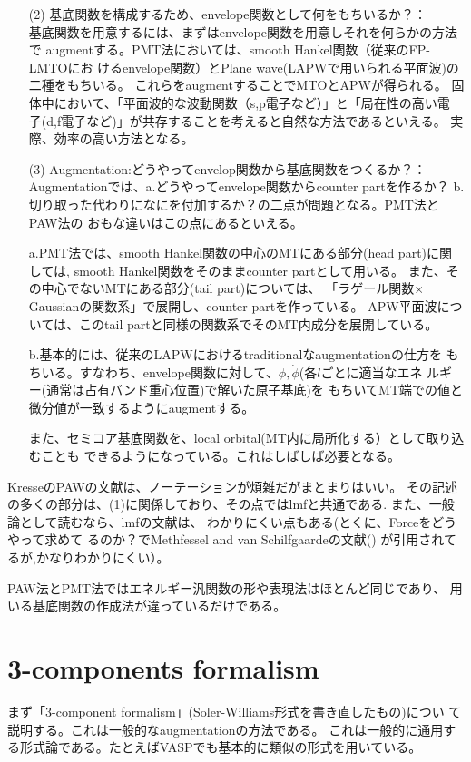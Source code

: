 \documentclass[twocolumn,showpacs,preprintnumbers,amsmath,amssymb,floatfix]{revtex4-1}
\def\phidot{\dot{\phi}}
\begin{document}
\begin{itemize}
\item[(2)]
基底関数を構成するため、envelope関数として何をもちいるか？：\\
基底関数を用意するには、まずはenvelope関数を用意しそれを何らかの方法で
augmentする。PMT法においては、smooth Hankel関数（従来のFP-LMTOにお
けるenvelope関数）とPlane wave(LAPWで用いられる平面波)の二種をもちいる。
これらをaugmentすることでMTOとAPWが得られる。
固体中において、「平面波的な波動関数（s,p電子など）」と「局在性の高い電
子(d,f電子など)」が共存することを考えると自然な方法であるといえる。
実際、効率の高い方法となる。

\item[(3)]
Augmentation:どうやってenvelop関数から基底関数をつくるか？：\\
Augmentationでは、a.どうやってenvelope関数からcounter partを作るか？
b.切り取った代わりになにを付加するか？の二点が問題となる。PMT法とPAW法の
おもな違いはこの点にあるといえる。

a.PMT法では、smooth Hankel関数の中心のMTにある部分(head part)に関しては,
smooth Hankel関数をそのままcounter partとして用いる。
また、その中心でないMTにある部分(tail part)については、
「ラゲール関数$\times$Gaussianの関数系」で展開し、counter partを作っている。
APW平面波については、このtail partと同様の関数系でそのMT内成分を展開している。

b.基本的には、従来のLAPWにおけるtraditionalなaugmentationの仕方を
もちいる。すなわち、envelope関数に対して、$\phi,\phidot$(各$l$ごとに適当なエネ
ルギー(通常は占有バンド重心位置)で解いた原子基底)を
もちいてMT端での値と微分値が一致するようにaugmentする。


また、セミコア基底関数を、local orbital(MT内に局所化する）として取り込むことも
できるようになっている。これはしばしば必要となる。

\end{itemize}

KresseのPAWの文献\cite{kresse99}は、ノーテーションが煩雑だがまとまりはいい。
その記述の多くの部分は、(1)に関係しており、その点ではlmfと共通である.
また、一般論として読むなら、lmfの文献\cite{lmfchap}は、
わかりにくい点もある(とくに、Forceをどうやって求めて
るのか？でMethfessel and van Schilfgaardeの文献(\cite{molforce})
が引用されてるが,かなりわかりにくい）。

PAW法とPMT法ではエネルギー汎関数の形や表現法はほとんど同じであり、
用いる基底関数の作成法が違っているだけである。


\section{3-components formalism}
\label{sec:formalism}
まず「3-component formalism」(Soler-Williams形式を書き直したもの)につい
て説明する。これは一般的なaugmentationの方法である。
これは一般的に通用する形式論である。たとえばVASPでも基本的に類似の形式を用いている。
\end{document}
